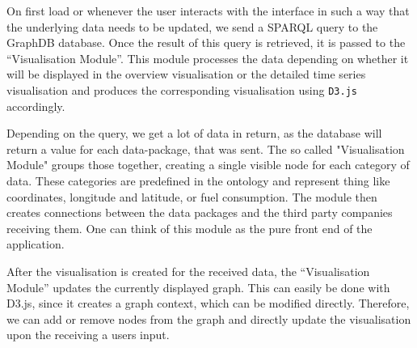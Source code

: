 \documentclass[../paper.tex]{subfiles}
\begin{document}
  On first load or whenever the user interacts with the interface in such a way
  that the underlying data needs to be updated, we send a SPARQL query to the
  GraphDB database. Once the result of this query is retrieved, it is passed to
  the “Visualisation Module”. This module processes the data depending on
  whether it will be displayed in the overview visualisation or the detailed
  time series visualisation and produces the corresponding visualisation
  using \texttt{D3.js} accordingly.

  Depending on the query, we get a lot of data in return, as the database
  will return a value for each data-package, that was sent. The so called
  "Visualisation Module" groups those together, creating a single visible
  node for each category of data. These categories are predefined in the
  ontology and represent thing like coordinates, longitude and latitude, or
  fuel consumption. The module then creates connections between the data packages
  and the third party companies receiving them. One can think of this module
  as the pure front end of the application.

  After the visualisation is created for the received data, the “Visualisation Module”
  updates the currently displayed graph. This can easily be done with D3.js, since
  it creates a graph context, which can be modified directly. Therefore,
  we can add or remove nodes from the graph and directly update the visualisation
  upon the receiving a users input.
\end{document}
